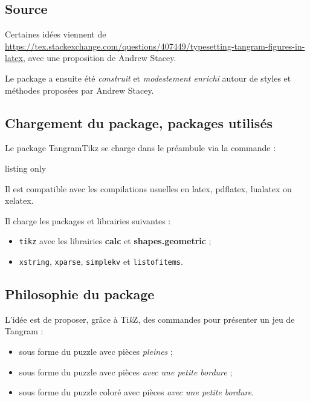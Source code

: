 \documentclass{article}
\providecommand\tikzlogo{Ti\textit{k}Z}
\let\TikZ\tikzlogo
\newcommand\Cle[1]{{\bfseries\sffamily\textlangle #1\textrangle}}
\begin{document}
\subsection{Source}

Certaines idées viennent de \url{https://tex.stackexchange.com/questions/407449/typesetting-tangram-figures-in-latex}, avec une proposition de Andrew Stacey.

\smallskip

Le package a ensuite été \textit{construit} et \textit{modestement enrichi} autour de styles et méthodes proposées par Andrew Stacey.

\subsection{Chargement du package, packages utilisés}

Le package \textsf{TangramTikz} se charge dans le préambule via la commande :

\begin{PresentationCode}{listing only}
\usepackage{TangramTikz}
\end{PresentationCode}

Il est compatible avec les compilations usuelles en \textsf{latex}, \textsf{pdflatex}, \textsf{lualatex} ou \textsf{xelatex}.

\medskip

Il charge les packages et librairies suivantes :

\begin{itemize}
	\item \texttt{tikz} avec les librairies \Cle{calc} et \Cle{shapes.geometric} ;
	\item \texttt{xstring}, \texttt{xparse}, \texttt{simplekv} et \texttt{listofitems}.
\end{itemize}

\subsection{\og Philosophie \fg{} du package}

L'idée est de proposer, grâce à \TikZ, des \textsf{commandes} pour présenter un jeu de Tangram :

\begin{itemize}
	\item sous forme du puzzle avec pièces \textit{pleines} ;
	\item sous forme du puzzle avec pièces \textit{avec une petite bordure} ;
	\item sous forme du puzzle coloré avec pièces \textit{avec une petite bordure}.
\end{itemize}
\end{document}
